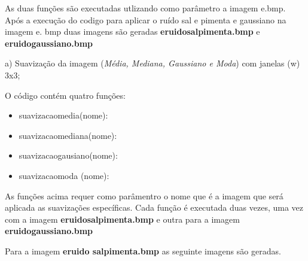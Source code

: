 \documentclass[10pt,a4paper]{article}
\begin{document}
\begin{flushleft}
As duas funções são executadas utlizando como parâmetro a imagem e.bmp. Após a execução do codigo para aplicar o ruído sal e pimenta e gaussiano na imagem e. bmp duas imagens são geradas \textbf{e\textunderscore ruido\textunderscore salpimenta.bmp} e  \textbf{e\textunderscore ruido\textunderscore gaussiano.bmp} 
\end{flushleft}

\begin{figure}[H]
    \centering
    \qquad
\end{figure}

\begin{flushleft}
a) Suavização da imagem (\textit {Média, Mediana, Gaussiano e Moda}) com janelas (w) 3x3;
\end{flushleft}

\begin{flushleft}
O código contém quatro funções:
\end{flushleft}

\begin{itemize}
    \item {\ttfamily suavizacao\textunderscore media(nome):}
    \item {\ttfamily suavizacao\textunderscore mediana(nome):}
    \item {\ttfamily suavizacao\textunderscore gausiano(nome):}
    \item {\ttfamily suavizacao\textunderscore moda (nome):}
\end{itemize}

\begin{flushleft}
As funções acima requer como parâmentro o nome que é a imagem que será aplicada as suavizações específicas. Cada função é executada duas vezes, uma vez com a imagem \textbf{e\textunderscore ruido\textunderscore salpimenta.bmp} e outra para a imagem \textbf{e\textunderscore ruido\textunderscore gaussiano.bmp}
\end{flushleft}

\begin{flushleft}
Para a imagem \textbf{e\textunderscore ruido \textunderscore salpimenta.bmp} as seguinte imagens são geradas.
\end{flushleft}
\end{document}

